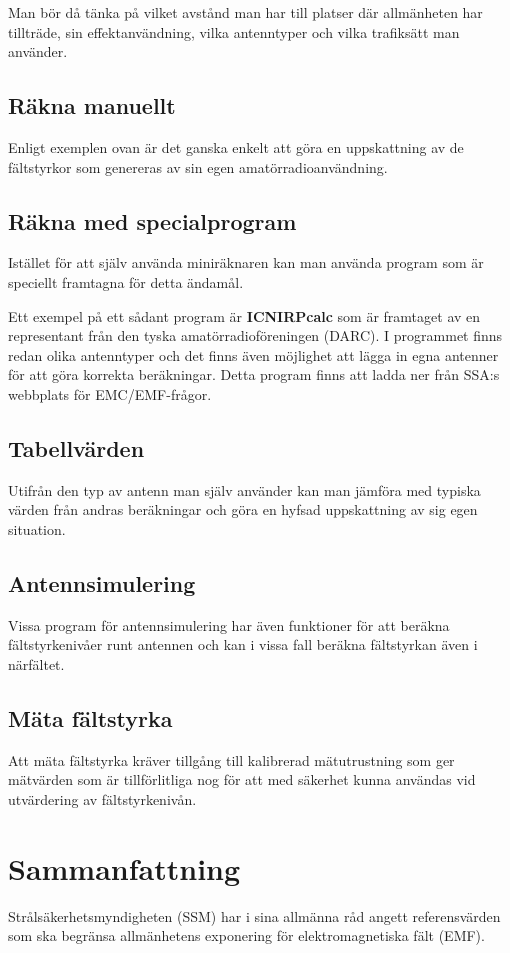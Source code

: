Man bör då tänka på vilket avstånd man har till platser där allmänheten har
tillträde, sin effektanvändning, vilka antenntyper och vilka trafiksätt man
använder.

\subsection{Räkna manuellt}

Enligt exemplen ovan är det ganska enkelt att göra en uppskattning av
de fältstyrkor som genereras av sin egen amatörradioanvändning.

\subsection{Räkna med specialprogram}

Istället för att själv använda miniräknaren kan man använda program
som är speciellt framtagna för detta ändamål.

Ett exempel på ett sådant program är \textbf{ICNIRPcalc} som är framtaget av en
representant från den tyska amatörradioföreningen (DARC).
I programmet finns redan olika antenntyper och det finns även möjlighet att
lägga in egna antenner för att göra korrekta beräkningar.
Detta program finns att ladda ner från SSA:s webbplats för EMC/EMF-frågor.

\subsection{Tabellvärden}
Utifrån den typ av antenn man själv använder kan man jämföra med
typiska värden från andras beräkningar och göra en hyfsad uppskattning
av sig egen situation.

\subsection{Antennsimulering}
Vissa program för antennsimulering har även funktioner för att beräkna
fältstyrkenivåer runt antennen och kan i vissa fall beräkna fältstyrkan
även i närfältet.

\subsection{Mäta fältstyrka}
Att mäta fältstyrka kräver tillgång till kalibrerad mätutrustning som
ger mätvärden som är tillförlitliga nog för att med säkerhet kunna användas
vid utvärdering av fältstyrkenivån.

\section{Sammanfattning}
Strålsäkerhetsmyndigheten (SSM) har i sina allmänna råd angett referensvärden
som ska begränsa allmänhetens exponering för elektromagnetiska fält (EMF).

